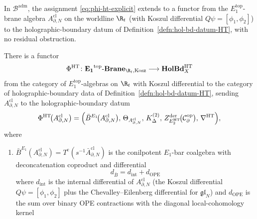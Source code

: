 \begin{thm}
\label{thm:typed-boundary-holographic-realisation}

In $\mathcal B^{\mathrm{adm}}$, the assignment
\eqref{eq:phi-ht-explicit} extends to a functor from the
$E_1^{\mathrm{top}}$-brane algebra
$A^{\mathrm{cl}}_{\partial,N}$ on the worldline $\R_t$ (with Koszul
differential $Q\psi=[\phi_1,\phi_2]$) to the holographic-boundary
datum of Definition~\ref{defn:hol-bd-datum-HT}, with no residual
obstruction.

There is a functor
\begin{equation}\label{eq:phi-ht-functor}
  \Phi^{\mathrm{HT}}\colon
  \mathbf{E_1}^{\mathrm{top}}\text{-}\mathbf{Brane}_{\R_t,\mathrm{Kosz}}
    \longrightarrow
  \mathbf{HolBd}^{\mathrm{HT}}_{X}
\end{equation}
from the category of \(E_1^{\mathrm{top}}\)-algebras on \(\R_t\) with
Koszul differential to the category of holographic-boundary data of
Definition~\ref{defn:hol-bd-datum-HT},
sending \(A^{\mathrm{cl}}_{\partial,N}\) to the holographic-boundary
datum
\begin{equation}\label{eq:phi-ht-explicit}
  \Phi^{\mathrm{HT}}\!\bigl(A^{\mathrm{cl}}_{\partial,N}\bigr)
  =\Bigl(\bar B^{E_1}\!\bigl(A^{\mathrm{cl}}_{\partial,N}\bigr),\,
        \Theta_{A^{\mathrm{cl}}_{\partial,N}},\,
        K^{(2)}_\Delta,\,
        Z^{\mathrm{der}}_{E_2^{\mathrm{HT}}}\!\bigl(
          \mathcal C^{\mathrm{op}}_\partial\bigr),\,
        \nabla^{\mathrm{HT}}\Bigr),
\end{equation}
where
\begin{enumerate}[label=\textup{(\roman*)}]
  \item \(\bar B^{E_1}(A^{\mathrm{cl}}_{\partial,N})
        =T^{\mathrm{c}}(s^{-1}\bar A^{\mathrm{cl}}_{\partial,N})\) is
        the conilpotent \(E_1\)-bar coalgebra with deconcatenation
        coproduct and differential
\begin{equation}\label{eq:bar-differential-explicit}
          d_{\bar B}=d_{\mathrm{int}}+d_{\mathrm{OPE}}
\end{equation}
        where \(d_{\mathrm{int}}\) is the internal differential of
        \(A^{\mathrm{cl}}_{\partial,N}\) (the Koszul differential
        \(Q\psi=[\phi_1,\phi_2]\) plus the Chevalley--Eilenberg
        differential for \(\mathfrak{gl}_N\)) and \(d_{\mathrm{OPE}}\)
        is the sum over binary OPE contractions with the diagonal
        local-cohomology kernel

\end{enumerate}
\end{thm}
